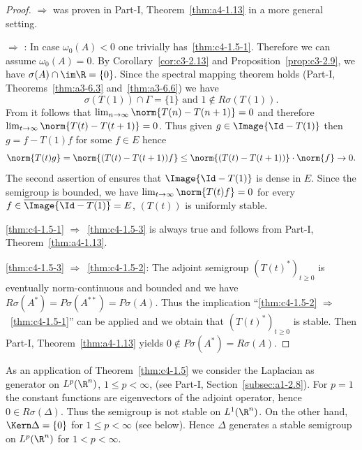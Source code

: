 \begin{proof}
 $\Rightarrow$  was proven in Part-I, Theorem~\ref{thm:a4-1.13} in a more general setting.

 $\Rightarrow$ :  In case $\omega_{0}(A) < 0$ one trivially has~\ref{thm:c4-1.5-1}.
Therefore we can assume $\omega_{0}(A) = 0$.
By Corollary~\ref{cor:c3-2.13} and Proposition~\ref{prop:c3-2.9},  we have $\sigma(A) \cap \im\R = \{0\}$.
Since the spectral mapping theorem holds 
(\cf Part-I, Theorems~\ref{thm:a3-6.3} and~\ref{thm:a3-6.6}) we have
\begin{equation}\label{eq:c4-1.5}
\sigma(T(1)) \cap \Gamma = \{1\} \text{ and } 1 \notin R{\sigma}(T(1)).
\end{equation}
From  it follows that $\lim_{n \to \infty} \norm{T(n) - T(n+1)} = 0$ and therefore $\lim_{t \to \infty} \norm{T(t) - T(t+1)} = 0$.
Thus given $g \in \Image{\Id - T(1)}$ then $g = f - T(1)f$ for some $f \in E$ hence 
\[
\norm{T(t)g} = \norm{(T(t) - T(t+1))f} \leq \norm{(T(t) - T(t+1))} \cdot \norm{f} \to 0.
\]
The second assertion of  ensures that $\Image{\Id - T(1)}$ is dense in $E$.
Since the semigroup is bounded, we have $\lim_{t \to \infty} \norm{T(t)f} = 0$ for every $f \in \overline{\Image{\Id - T(1)}} = E$, \ie  $(T(t))$ is uniformly stable.

\ref{thm:c4-1.5-1} $\Rightarrow$~\ref{thm:c4-1.5-3} is always true and follows from Part-I, Theorem~\ref{thm:a4-1.13}.

\ref{thm:c4-1.5-3} $\Rightarrow$~\ref{thm:c4-1.5-2}:  
The adjoint semigroup $(T(t)^*)_{t \geq 0}$ is eventually norm-continuous and boun\-ded and we have $R{\sigma}(A^*) = P{\sigma}(A^{**}) = P{\sigma}(A)$.
Thus the implication \enquote{\ref{thm:c4-1.5-2} $\Rightarrow$~\ref{thm:c4-1.5-1}} can be applied and we obtain that $(T(t)^*)_{t \geq 0}$ is stable.
Then Part-I, Theorem~\ref{thm:a4-1.13} yields $0 \notin P{\sigma}(A^*) = R{\sigma}(A)$.
\end{proof}
As an application of Theorem~\ref{thm:c4-1.5}  we consider the Laplacian as generator on $L^{p}(\R^{n})$, $1 \leq p < \infty$, (see Part-I, Section~\ref{subsec:a1-2.8}).
For $p = 1$ the constant functions are eigenvectors of the adjoint operator, hence $0 \in R{\sigma}(\Delta)$.
Thus the semigroup is not stable on $L^{1}(\R^{n})$.
On the other hand, $\Kern\Delta =\{ 0 \}$ for $ 1 \leq p < \infty$ (see below). 
Hence $\Delta$ generates a stable semigroup on $L^{p}(\R^{n})$ for $1 < p < \infty$.

